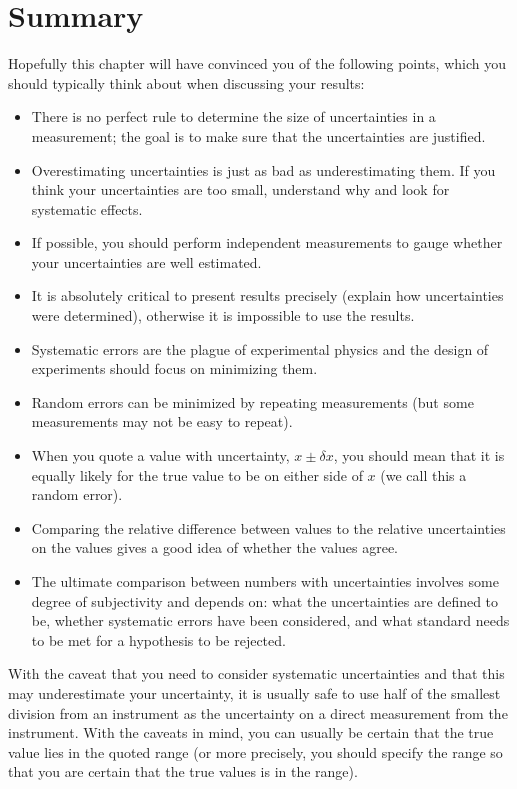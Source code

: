 \section{Summary}
Hopefully this chapter will have convinced you of the following points, which you should typically think about when discussing your results:
\begin{itemize}
\item There is no perfect rule to determine the size of uncertainties in a measurement; the goal is to make sure that the uncertainties are justified.
\item Overestimating uncertainties is just as bad as underestimating them. If you think your uncertainties are too small, understand why and look for systematic effects.
\item If possible, you should perform independent measurements to gauge whether your uncertainties are well estimated.
\item It is absolutely critical to present results precisely (explain how uncertainties were determined), otherwise it is impossible to use the results.
\item Systematic errors are the plague of experimental physics and the design of experiments should focus on minimizing them.
\item Random errors can be minimized by repeating measurements (but some measurements may not be easy to repeat).
\item When you quote a value with uncertainty, $x\pm\delta x$, you should mean that it is equally likely for the true value to be on either side of $x$ (we call this a random error).
\item Comparing the relative difference between values to the relative uncertainties on the values gives a good idea of whether the values agree.
\item The ultimate comparison between numbers with uncertainties involves some degree of subjectivity and depends on: what the uncertainties are defined to be, whether systematic errors have been considered, and what standard needs to be met for a hypothesis to be rejected.
\end{itemize}

With the caveat that you need to consider systematic uncertainties and that this may underestimate your uncertainty, it is usually safe to use half of the smallest division from an instrument as the uncertainty on a direct measurement from the instrument. With the caveats in mind, you can usually be certain that the true value lies in the quoted range (or more precisely, you should specify the range so that you are certain that the true values is in the range).

